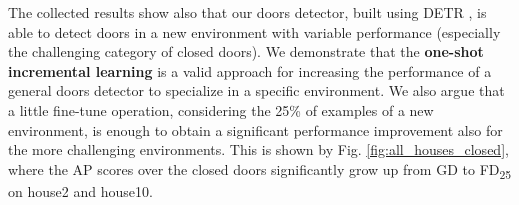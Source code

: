 The collected results show also that our doors detector, built using DETR \cite{detr}, is able to detect doors in a new environment with variable performance (especially the challenging category of closed doors). We demonstrate that the \textbf{one-shot incremental learning} is a valid approach for increasing the performance of a general doors detector to specialize in a specific environment. We also argue that a little fine-tune operation, considering the 25\% of examples of a new environment, is enough to obtain a significant performance improvement also for the more challenging environments. This is shown by Fig. \ref{fig:all_houses_closed}, where the AP scores over the closed doors significantly grow up from \textsf{GD} to \textsf{FD\textsubscript{25}} on \textsf{house2} and \textsf{house10}.



